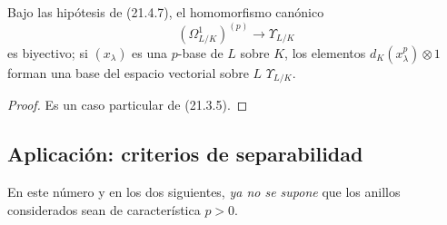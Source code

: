 \begin{proposition}[21.4.8]
\label{0.21.4.8-fr}
Bajo las hipótesis de (21.4.7), el homomorfismo canónico
\begin{equation}
\tag{21.4.8.1}\label{0.21.4.8.1-fr}
(\Omega^1_{L/K})^{(p)}\longrightarrow\Upsilon_{L/K}
\end{equation}
es biyectivo; si $(x_\lambda)$ es una $p$-base de $L$ sobre $K$, los elementos
$d_K(x_\lambda^p)\otimes1$ forman una base del espacio vectorial sobre $L$ $\Upsilon_{L/K}$.
\end{proposition}
\begin{proof}
Es un caso particular de (21.3.5).
\end{proof}

\subsection{Aplicación: criterios de separabilidad}
\label{0.21.5-fr}

En este número y en los dos siguientes, \emph{ya no se supone} que los anillos
considerados sean de característica $p>0$.

